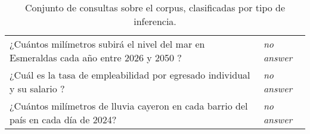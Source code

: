 \documentclass[12pt,oneside]{book}
\begin{document}
\begin{table}[H]
\begin{tabularx}{\textwidth}{@{}X l@{}}
        ¿Cuántos milímetros subirá el nivel del mar en Esmeraldas cada año entre 2026 y 2050 ? & \emph{no answer} \\
        ¿Cuál es la tasa de empleabilidad por egresado individual y su salario ? & \emph{no answer} \\
        ¿Cuántos milímetros  de lluvia cayeron en cada barrio del país en cada día de 2024? & \emph{no answer} \\
        \bottomrule
    \end{tabularx}
    \caption{Conjunto de consultas sobre el corpus, clasificadas por tipo de inferencia.}
    \label{tab:consultas}
\end{table}


\end{document}
